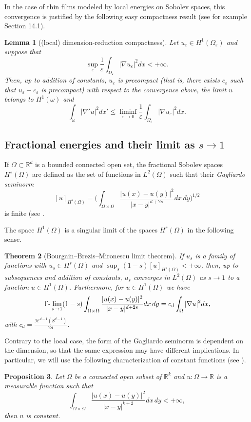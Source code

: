 \documentclass{article}
\newtheorem{lemma}{Lemma}%
\newtheorem{proposition}[lemma]{Proposition}
\newtheorem{theorem}[lemma]{Theorem}
\newcommand{\e}{\varepsilon}
\begin{document}
In the case of thin films modeled by local energies on Sobolev spaces, this convergence is justified by the following easy compactness result (see for example \cite{GCB} Section 14.1).

\begin{lemma}[(local) dimension-reduction compactness]\label{local-lemma}
Let $u_\e\in H^1(\Omega_\e)$ and suppose that 
$$
\sup_\e\frac1\e\int_{\Omega_\e} |\nabla u_\e|^2dx<+\infty.
$$
Then, up to addition of constants, $u_\e$ is precompact (that is, there exists $c_\e$ such that $u_\e+c_\e$ is precompact) with respect to the convergence above, the limit  $u$ belongs to $H^1(\omega)$ and
$$
\int_\omega |\nabla'u|^2dx'\le \liminf_{\e\to 0}\frac1\e\int_{\Omega_\e} |\nabla u_\e|^2dx.
$$ 
\end{lemma}

\subsection{Fractional energies and their limit as $s\to1$}
If $\Omega\subset \mathbb R^d$ is a bounded connected open set, the fractional Sobolev spaces $H^s(\Omega)$ are defined as the set of functions in $L^2(\Omega)$ such that their {\em Gagliardo seminorm}
$$
[u]_{H^{s}(\Omega)}=\bigg(\int_{\Omega\times \Omega} \frac{|u(x)-u(y)|^2}{|x-y|^{d+2s}} dx\,dy\bigg)^{1/2}
$$
is finite (see \cite{leofrac,DPV}. 

The space $H^1(\Omega)$ is a singular limit of the spaces $H^s(\Omega)$ in the following sense.

\begin{theorem}[Bourgain--Brezis--Mironescu limit theorem]
If $u_s$ is a family of functions with $u_s\in H^s(\Omega)$ and $\sup_s(1-s)[u]_{H^s(\Omega)}<+\infty$,
then, up to subsequences and addition of constants, $u_s$ converges in $L^2(\Omega)$ as $s\to 1$ to a function $u\in H^1(\Omega)$. Furthermore, for $u\in H^1(\Omega)$ we have
$$
\Gamma\hbox{-}\lim_{s\to 1} (1-s)\int_{\Omega\times \Omega} \frac{|u(x)-u(y)|^2}{|x-y|^{d+2s}} dx\,dy=c_d\int_\Omega|\nabla u|^2dx,
$$
with $\displaystyle c_d=\frac{\mathcal H^{d-1}(S^{d-1})}{2d}$.
\end{theorem}

Contrary to the local case, the form of the Gagliardo seminorm is dependent on the dimension, so that the same expression may have different implications. In particular, we will use the following characterization of constant functions (see \cite[Proposition 2]{brezis2002recognize}).

\begin{proposition}\label{constant}
Let $\Omega$ be a connected open subset of $\mathbb R^k$ and $u:\Omega\to \mathbb R$ is a measurable function such that
$$
\int_{\Omega\times \Omega} \frac{|u(x)-u(y)|^2}{|x-y|^{k+2}} dx\,dy<+\infty,
$$
then $u$ is constant.
\end{proposition}
\end{document}
